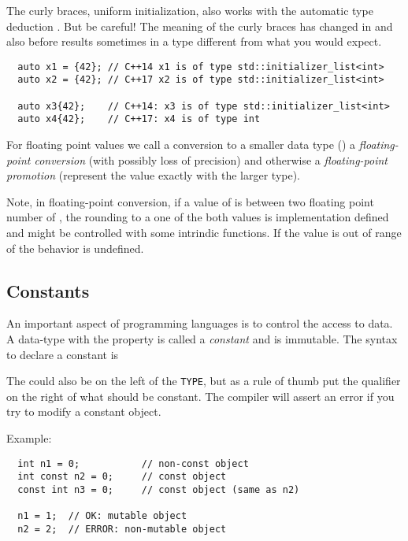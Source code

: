 \begin{rem}
  The\marginpar{[\cxx{17}]} curly braces, \ie uniform initialization, also works with the automatic type deduction . But be careful! The meaning
  of the curly braces has changed in  and also before results sometimes in a type different from what you would expect.
  \begin{verbatim}
  auto x1 = {42}; // C++14 x1 is of type std::initializer_list<int>
  auto x2 = {42}; // C++17 x2 is of type std::initializer_list<int>

  auto x3{42};    // C++14: x3 is of type std::initializer_list<int>
  auto x4{42};    // C++17: x4 is of type int
  \end{verbatim}
\end{rem}

\begin{defn}
  For floating point values we call a conversion to a smaller data type (\eg {}) a \emph{floating-point conversion} (with possibly loss of precision) and otherwise a \emph{floating-point promotion} (represent the value exactly with the larger type).
\end{defn}

\begin{rem}
  Note, in floating-point conversion, if a value of  is between two floating point number of , the rounding to a one of the both values is implementation defined and might be controlled with some intrindic functions. If the value is out of range of  the behavior is undefined.
\end{rem}

\subsection{Constants\label{sec:const}}
An important aspect of programming languages is to control the access to data. A data-type with the property 
is called a \emph{constant} and is immutable. The syntax to declare a constant is


The  could also be on the left of the \texttt{TYPE}, but as a rule of thumb put the qualifier  on the right of what
should be constant. The compiler will assert an error if you try to modify a constant object.

Example:
\begin{verbatim}
  int n1 = 0;           // non-const object
  int const n2 = 0;     // const object
  const int n3 = 0;     // const object (same as n2)

  n1 = 1;  // OK: mutable object
  n2 = 2;  // ERROR: non-mutable object
\end{verbatim}

